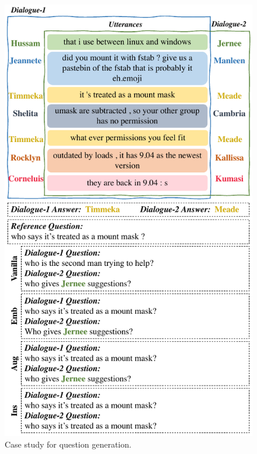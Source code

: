 \begin{figure}[t!]
	\centering
	\includegraphics[width=0.95\linewidth]{case-qg.pdf}
	\caption{Case study for question generation.} 
	\label{fig:case-qg}
\end{figure}

